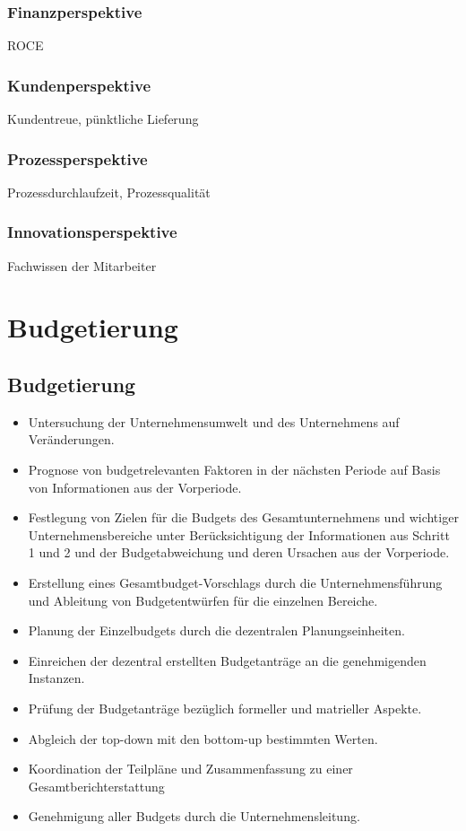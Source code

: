 \documentclass{article}
\begin{document}
\subsubsection{Finanzperspektive}
ROCE
\subsubsection{Kundenperspektive}
Kundentreue, pünktliche Lieferung

\subsubsection{Prozessperspektive}
Prozessdurchlaufzeit, Prozessqualität

\subsubsection{Innovationsperspektive}
Fachwissen der Mitarbeiter

\section{Budgetierung}

\subsection{Budgetierung}
\begin{itemize}
\item Untersuchung der Unternehmensumwelt und des Unternehmens auf
Veränderungen.
\item Prognose von budgetrelevanten Faktoren in der nächsten Periode auf Basis
von Informationen aus der Vorperiode.
\item Festlegung von Zielen für die Budgets des Gesamtunternehmens und
wichtiger Unternehmensbereiche unter Berücksichtigung der Informationen
aus Schritt 1 und 2 und der Budgetabweichung und deren Ursachen aus der
Vorperiode.
\item Erstellung eines Gesamtbudget-Vorschlags durch die Unternehmensführung
und Ableitung von Budgetentwürfen für die einzelnen Bereiche.
\item Planung der Einzelbudgets durch die dezentralen Planungseinheiten.
\item Einreichen der dezentral erstellten Budgetanträge an die genehmigenden
Instanzen. 
\item Prüfung der Budgetanträge bezüglich formeller und matrieller Aspekte.
\item Abgleich der top-down mit den bottom-up bestimmten Werten.
\item Koordination der Teilpläne und Zusammenfassung zu einer Gesamtberichterstattung
\item Genehmigung aller Budgets durch die Unternehmensleitung.

\end{itemize}
\end{document}
